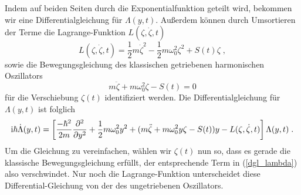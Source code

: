 
      Indem auf beiden Seiten durch die Exponentialfunktion geteilt wird, bekommen wir eine Differentialgleichung für $\Lambda(y,t)$.
      Außerdem können durch Umsortieren der Terme die Lagrange-Funktion $L(\zeta,\dot \zeta, t)$
      \begin{equation}
        L(\zeta,\dot \zeta, t) = \frac{1}{2}m\dot \zeta^2 - \frac{1}{2}m\omega_0^2\zeta^2 + S(t)\zeta \; ,
        \label{lagrange_zeta}
      \end{equation}
        sowie die Bewegungsgleichung des klassischen getriebenen harmonischen  Oszillators \cite{husimi}
        \begin{equation}
          m\ddot \zeta + m\omega_0^2\zeta - S(t) = 0
          \label{dgl_zeta}
        \end{equation}
      für die Verschiebung $\zeta(t)$ identifiziert werden.
      Die Differentialgleichung für $\Lambda(y,t)$ ist folglich
      \begin{equation}
        \text i \hbar \dot \Lambda(y,t) = \left[ \frac{-\hbar^2}{2m}\frac{\partial^2}{\partial y^2} + \frac{1}{2}m\omega_0^2y^2 + (m\ddot \zeta + m\omega_0^2y\zeta - S(t))y - L(\zeta,\dot \zeta, t) \right]\Lambda(y,t) \; .
        \label{dgl_lambda}
      \end{equation}
      Um die Gleichung zu vereinfachen, wählen wir $\zeta(t)$ nun so, dass es gerade die klassische Bewegungsgleichung erfüllt, der entsprechende Term in (\ref{dgl_lambda}) also verschwindet.
      Nur noch die Lagrange-Funktion unterscheidet diese Differential-Gleichung von der des ungetriebenen Oszillators.


